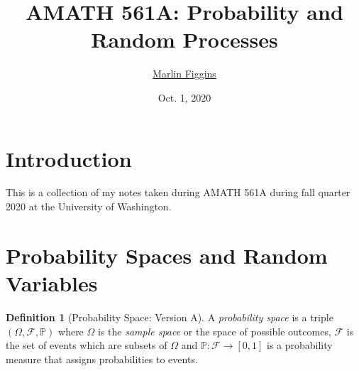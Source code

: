 \documentclass[12pt]{article}
\title{\bfseries\huge{AMATH 561A: Probability and Random Processes}\vspace{-1ex}} \author{\href{marlinfiggins@gmail.com}{\Large{Marlin Figgins}}\vspace{-2ex}}
\date{\large{Oct. 1, 2020}}
\newcommand{\calF}{\mathcal{F}}
\newcommand{\Prob}{\mathbb{P}}
\theoremstyle{definition}
\newtheorem{defn}[thm]{Definition}
\theoremstyle{remark}
\numberwithin{equation}{section}
\begin{document}
\maketitle

	\section*{\hfill Introduction \hfill}

  This is a collection of my notes taken during AMATH 561A during fall quarter 2020 at the University of Washington.

  \thispagestyle{empty}

  \newpage
  \tableofcontents
  \thispagestyle{empty}
  \newpage

  \setcounter{page}{1}


  \section{Probability Spaces and Random Variables}%
  \label{sec:probability_spaces_and_random_variables}


  \begin{defn}[Probability Space: Version A]
    A \emph{probability space} is a triple $(\Omega, \calF, \Prob)$ where $\Omega$ is the \emph{sample space} or the space of possible outcomes, $\calF$ is the set of events which are subsets of $\Omega$ and $\Prob \colon \calF \to [0,1]$ is a probability measure that assigns probabilities to events.
 \end{defn} 
\end{document}
